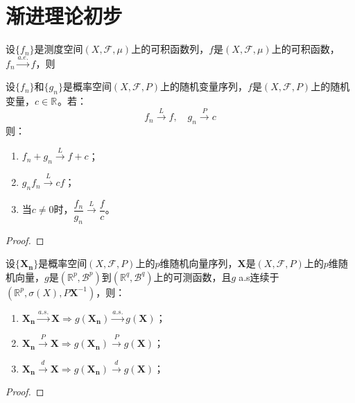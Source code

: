 \chapter{渐进理论初步}

\begin{theorem}
	设$\{f_n\}$是测度空间$(X,\mathscr{F},\mu)$上的可积函数列，$f$是$(X,\mathscr{F},\mu)$上的可积函数，$f_n\overset{a.e.}{\longrightarrow}f$，则
\end{theorem}
\begin{theorem}\label{theo:Slutsky}
	设$\{f_n\}$和$\{g_n\}$是概率空间$(X,\mathscr{F},P)$上的随机变量序列，$f$是$(X,\mathscr{F},P)$上的随机变量，$c\in\mathbb{R}^{}$。若：
	\begin{equation*}
		f_n\overset{L}{\longrightarrow}f,\quad g_n\overset{P}{\longrightarrow}c
	\end{equation*}
	则：
	\begin{enumerate}
		\item $f_n+g_n\overset{L}{\longrightarrow}f+c$；
		\item $g_nf_n\overset{L}{\longrightarrow}cf$；
		\item 当$c\ne0$时，$\dfrac{f_n}{g_n}\overset{L}{\longrightarrow}\dfrac{f}{c}$。
	\end{enumerate}
\end{theorem}
\begin{proof}

\end{proof}
\begin{theorem}\label{theo:ContinuousMappingTheorem}
	设$\{\mathbf{X_n}\}$是概率空间$(X,\mathscr{F},P)$上的$p$维随机向量序列，$\mathbf{X}$是$(X,\mathscr{F},P)$上的$p$维随机向量，$g$是$(\mathbb{R}^{p},\mathcal{B}^p)$到$(\mathbb{R}^{q},\mathcal{B}^q)$上的可测函数，且$g\;$a.s连续于$(\mathbb{R}^{p},\sigma(X),P\mathbf{X}^{-1})$，则：
	\begin{enumerate}
		\item $\mathbf{X_n}\overset{a.s.}{\longrightarrow}\mathbf{X}\Rightarrow g(\mathbf{X_n})\overset{a.s.}{\longrightarrow}g(\mathbf{X})$；
		\item $\mathbf{X_n}\overset{P}{\longrightarrow}\mathbf{X}\Rightarrow g(\mathbf{X_n})\overset{P}{\longrightarrow}g(\mathbf{X})$；
		\item $\mathbf{X_n}\overset{d}{\longrightarrow}\mathbf{X}\Rightarrow g(\mathbf{X_n})\overset{d}{\longrightarrow}g(\mathbf{X})$；
	\end{enumerate}
\end{theorem}
\begin{proof}
	
\end{proof}



